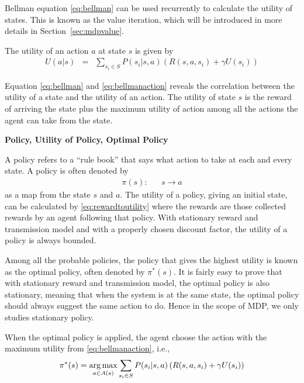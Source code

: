 Bellman equation \eqref{eq:bellman} can be used recurrently to calculate the utility of states. This is known as the value iteration, which will be introduced in more details in Section~\ref{sec:mdpvalue}.

The utility of an action $a$ at state $s$ is given by
\begin{eqnarray}
	U(a|s) &=& \sum_{s_i \in S} P(s_i|s,a)\left(R(s,a,s_i) + \gamma U(s_i)\right) \label{eq:bellmanaction}
\end{eqnarray}
 
Equation \eqref{eq:bellman} and \eqref{eq:bellmanaction} reveals the correlation between the utility of a state and the utility of an action. The utility of state $s$ is the reward of arriving the state plus the maximum utility of action among all the actions the agent can take from the state.

\vspace{0.1in}
\noindent \textbf{Policy, Utility of Policy, Optimal Policy}
\vspace{0.1in}

A policy refers to a ``rule book'' that says what action to take at each and every state. A policy is often denoted by
\begin{eqnarray}
	\pi(s): && s \rightarrow a \label{eq:mdppolicy}
\end{eqnarray}
as a map from the state $s$ and $a$. The utility of a policy, giving an initial state, can be calculated by \eqref{eq:rewardtoutility} where the rewards are those collected rewards by an agent following that policy. With stationary reward and transmission model and with a properly chosen discount factor, the utility of a policy is always bounded. 

Among all the probable policies, the policy that gives the highest utility is known as the optimal policy, often denoted by $\pi^*(s)$. It is fairly easy to prove that with stationary reward and transmission model, the optimal policy is also stationary, meaning that when the system is at the same state, the optimal policy should always suggest the same action to do. Hence in the scope of MDP, we only studies stationary policy.

When the optimal policy is applied, the agent choose the action with the maximum utility from \eqref{eq:bellmanaction}, i.e.,
\begin{eqnarray}
	\pi^*(s) = \operatorname*{arg\,max}_{a\in A(s)} \sum_{s_i \in S} P(s_i|s,a)\left(R(s,a,s_i) + \gamma U(s_i)\right) \label{eq:mdpoptpolicy}
\end{eqnarray}

